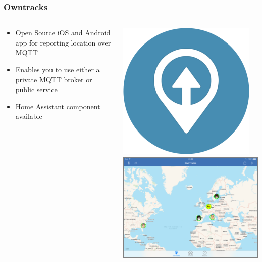\documentclass[aspectratio=169,11pt,hyperref={colorlinks=true}]{beamer}
\begin{document}
\begin{frame}
    \frametitle{Owntracks}
    \begin{columns}[T]
        \begin{column}{.48\textwidth}
            \vspace{15mm}
            \begin{itemize}
                \item Open Source iOS and Android app for reporting location over MQTT
                \item Enables you to use either a private MQTT broker or public service
                \item Home Assistant component available
            \end{itemize}
        \end{column}
        \begin{column}{.48\textwidth}
            \centering
            \begin{centering}
                \includegraphics[height=.35\textheight]{logo-small.png}\\
                \vspace{5mm}
                \includegraphics[width=.8\textwidth]{ipad-public-map.png}
            \end{centering}
        \end{column}
    \end{columns}
\end{frame}
\end{document}
